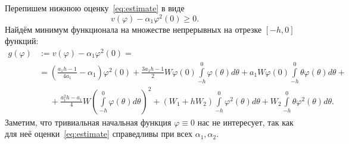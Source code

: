 \documentclass[a4paper,14pt]{article}
\begin{document}
Перепишем нижнюю оценку~\eqref{eq:estimate} в виде
\begin{equation*}
  v(\varphi) - \alpha_1 \varphi^2(0) \geqslant 0.
\end{equation*}
Найдём минимум функционала на множестве непрерывных
на отрезке $[-h, 0]$ функций:
\begin{equation*}
  \begin{aligned}
    g(\varphi)
    &:=
      v(\varphi) - \alpha_1 \varphi^2(0) = \\
    &=
      \left(
      \frac{a_1 h - 1}{4 a_1}
      - \alpha_1
      \right)
      \varphi^2(0)
      +
      \frac{3 a_1 h - 1}{2}
      W
      \varphi(0)
      \int\limits_{-h}^{0} \varphi(\theta) d\theta
      +
      a_1 W \varphi(0)
      \int\limits_{-h}^{0} \theta \varphi(\theta) d\theta + \\
    &\phantom{=}
      +
      \frac{a_1^2 h - a_1}{4} W
      {\left(
      \int\limits_{-h}^{0} \varphi(\theta) d\theta
      \right)}^2
      +
      \left( W_1 + h W_2 \right)
      \int\limits_{-h}^{0} \varphi^2(\theta) d\theta
      +
      W_2
      \int\limits_{-h}^{0} \theta \varphi^2(\theta) d\theta.
  \end{aligned}
\end{equation*}
Заметим, что тривиальная начальная функция $\varphi \equiv 0$
нас не интересует, так как для неё оценки~\eqref{eq:estimate} справедливы
при всех $\alpha_1, \alpha_2$.
\end{document}
